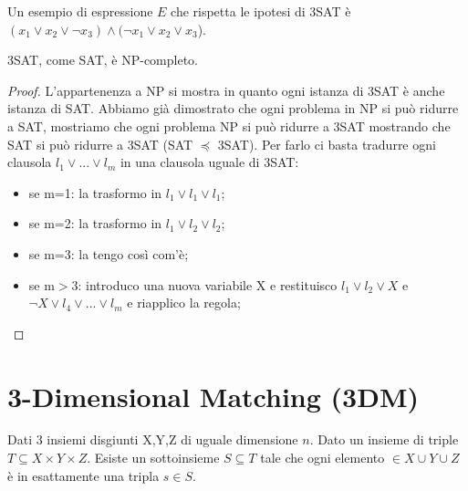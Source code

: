 \begin{example}
    Un esempio di espressione $E$ che rispetta le ipotesi di 3SAT è $(x_1 \lor x_2 \lor \lnot x_3) \land (\lnot x_1 \lor x_2 \lor x_3$). 
\end{example}

\begin{theorem}
    3SAT, come SAT, è NP-completo. 
\end{theorem}
\begin{proof}
    L'appartenenza a NP si mostra in quanto ogni istanza di 3SAT è anche istanza di SAT.
    Abbiamo già dimostrato che ogni problema in NP si può ridurre a SAT, mostriamo che ogni problema NP si può ridurre a 3SAT mostrando che SAT si può ridurre a 3SAT (SAT $\preceq$ 3SAT).
    Per farlo ci basta tradurre ogni clausola $l_1\lor...\lor l_m$ in una clausola uguale di 3SAT:
    \begin{itemize}
        \item se m=1: la trasformo in $l_1 \lor l_1 \lor l_1$;
        \item se m=2: la trasformo in $l_1 \lor l_2 \lor l_2$;
        \item se m=3: la tengo così com'è; 
        \item se m$>$3: introduco una nuova variabile X e restituisco $l_1 \lor l_2 \lor X$ e $\lnot X \lor l_4 \lor ... \lor l_m$ e riapplico la regola;
    \end{itemize}
\end{proof}

\section{3-Dimensional Matching (3DM) ~\cite{6}} 
Dati 3 insiemi disgiunti X,Y,Z di uguale dimensione $n$.
Dato un insieme di triple $T\subseteq X \times Y \times Z$.
Esiste un sottoinsieme $S\subseteq T$ tale che ogni elemento $\in X \cup Y \cup Z$ è in esattamente una tripla $s \in S$. 

